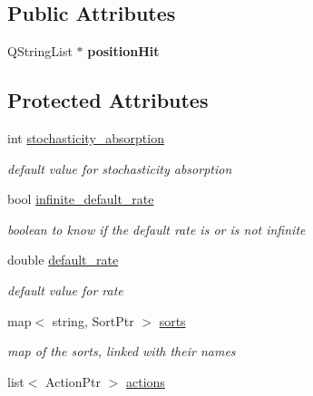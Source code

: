 \subsection*{Public Attributes}
\begin{DoxyCompactItemize}
\item 
\hypertarget{classPH_a4833770f4b4188111f13078d108c281e}{Q\+String\+List $\ast$ {\bfseries position\+Hit}}\label{classPH_a4833770f4b4188111f13078d108c281e}

\end{DoxyCompactItemize}
\subsection*{Protected Attributes}
\begin{DoxyCompactItemize}
\item 
\hypertarget{classPH_abdd55c7db00c19b89de0afba20d97b24}{int \hyperlink{classPH_abdd55c7db00c19b89de0afba20d97b24}{stochasticity\+\_\+absorption}}\label{classPH_abdd55c7db00c19b89de0afba20d97b24}

\begin{DoxyCompactList}\small\item\em default value for stochasticity absorption \end{DoxyCompactList}\item 
bool \hyperlink{classPH_aa66efaf095a379c3b108a023d7c98afa}{infinite\+\_\+default\+\_\+rate}
\begin{DoxyCompactList}\small\item\em boolean to know if the default rate is or is not infinite \end{DoxyCompactList}\item 
\hypertarget{classPH_a7a9525bc83257efefbaf9e78d96723ca}{double \hyperlink{classPH_a7a9525bc83257efefbaf9e78d96723ca}{default\+\_\+rate}}\label{classPH_a7a9525bc83257efefbaf9e78d96723ca}

\begin{DoxyCompactList}\small\item\em default value for rate \end{DoxyCompactList}\item 
\hypertarget{classPH_a889cc129633e88e4257f56dec04c5bac}{map$<$ string, Sort\+Ptr $>$ \hyperlink{classPH_a889cc129633e88e4257f56dec04c5bac}{sorts}}\label{classPH_a889cc129633e88e4257f56dec04c5bac}

\begin{DoxyCompactList}\small\item\em map of the sorts, linked with their names \end{DoxyCompactList}\item 
\hypertarget{classPH_a730f2eb0cd79487213cac9565d746a05}{list$<$ Action\+Ptr $>$ \hyperlink{classPH_a730f2eb0cd79487213cac9565d746a05}{actions}}\label{classPH_a730f2eb0cd79487213cac9565d746a05}


\end{DoxyCompactItemize}
